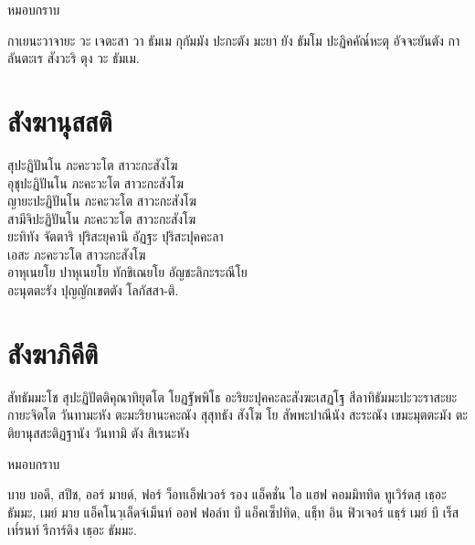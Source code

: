 \begin{instruction}
หมอบกราบ
\end{instruction}

\begin{thaitrans}
กาเยนะวาจายะ วะ เจตะสา วา
ธัมเม กุกัมมัง ปะกะตัง มะยา ยัง
ธัมโม ปะฏิคคัณ๎หะตุ อัจจะยันตัง
กาลันตะเร สังวะริ ตุง วะ ธัมเม.
\end{thaitrans}

\chapter{สังฆานุสสติ}

\begin{leader}
\end{leader}

สุปะฏิปันโน ภะคะวะโต สาวะกะสังโฆ\\
อุชุปะฏิปันโน ภะคะวะโต สาวะกะสังโฆ\\
ญายะปะฏิปันโน ภะคะวะโต สาวะกะสังโฆ\\
สามีจิปะฏิปันโน ภะคะวะโต สาวะกะสังโฆ\\
ยะทิทัง จัตตาริ ปุริสะยุคานิ อัฏฐะ ปุริสะปุคคะลา\\
เอสะ ภะคะวะโต สาวะกะสังโฆ\\
อาหุเนยโย ปาหุเนยโย ทักขิเณยโย อัญชะลิกะระณีโย\\
อะนุตตะรัง ปุญญักเขตตัง โลกัสสา-ติ.\\

\chapter{สังฆาภิคีติ}

\begin{leader}
\end{leader}

\begin{thaitrans}
สัทธัมมะโช สุปะฏิปัตติคุณาทิยุตโต
โยฏฐัพพิโธ อะริยะปุคคะละสังฆะเสฏโฐ
สีลาทิธัมมะปะวะราสะยะกายะจิตโต
วันทามะหัง ตะมะริยานะคะณัง สุสุทธัง
สังโฆ โย สัพพะปาณีนัง สะระณัง เขมะมุตตะมัง
ตะติยานุสสะติฏฐานัง วันทามิ ตัง สิเรนะหัง
\end{thaitrans}

\begin{instruction}
หมอบกราบ
\end{instruction}

\begin{thaitrans}
บาย บอดี, สปีช, ออร์ มายด์,
ฟอร์ ว็อทเอ็ฟเวอร์ รอง แอ็คชั่น ไอ แฮฟ คอมมิททิด ทูเวิร์ดสฺ  เธฺอะ ธัมมะ,
เมย์ มาย แอ็คโนวฺเล็ดจ์เม็นท์ ออฟ ฟอล์ท บี แอ็คเซ็ปทิด,
แธฺ็ท อิน ฟิวเจอร์ แธฺร์ เมย์ บี เร็สเท๎รนท์ รีการ์ดิง เธฺอะ ธัมมะ.
\end{thaitrans}

